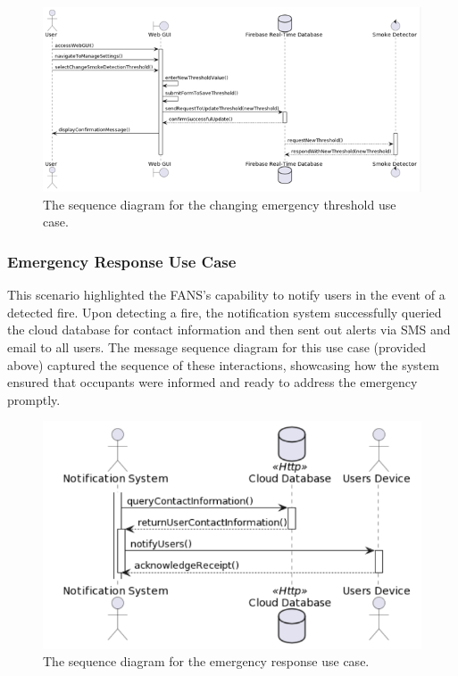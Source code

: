 \begin{figure}[H]
    \centering
    \includegraphics[width=\imagewidth]{../assets/sequence/ChangingSmokeDetectionThresholdSequenceDiagram.png}
    \caption{The sequence diagram for the changing emergency threshold use case.}
\end{figure}

\subsubsection{Emergency Response Use Case}

This scenario highlighted the FANS’s capability to notify users in the event of a detected fire. Upon detecting a fire,
the notification system successfully queried the cloud database for contact information and then sent out alerts via
SMS and email to all users. The message sequence diagram for this use case (provided above) captured the sequence of
these interactions, showcasing how the system ensured that occupants were informed and ready to address the emergency
promptly.

\begin{figure}[H]
    \centering
    \includegraphics[width=\imagewidth]{../assets/sequence/EmergencyResponseUseCase.png}
    \caption{The sequence diagram for the emergency response use case.}
\end{figure}
